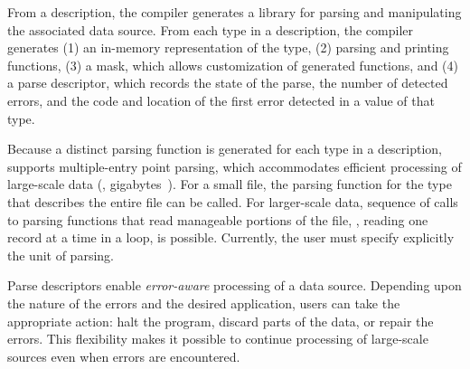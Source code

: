 From a description, the \pads{} compiler generates a \C{} library for
parsing and manipulating the associated data source.  From each type
in a \pads{} description, the compiler generates (1) an in-memory
representation of the type, (2) parsing and printing functions, (3) a
mask, which allows customization of generated functions, and (4) a
parse descriptor, which records the state of the parse, the number of
detected errors, and the code and location of the first error detected
in a value of that type.

Because a distinct parsing function is generated for each type in a
\pads{} description, \pads{} supports multiple-entry point parsing,
which accommodates efficient processing of large-scale data (\eg{},
gigabytes~\cite{fisher+:pldi05}).  For a small file, the parsing
function for the \pads{} type that describes the entire file can be
called.  For larger-scale data, sequence of calls to parsing functions
that read manageable portions of the file, \eg{}, reading one record
at a time in a loop, is possible.  Currently, the user must specify
explicitly the unit of parsing.


Parse descriptors enable \emph{error-aware} processing of a data
source.  Depending upon the nature of the errors and the desired
application, users can take the appropriate action: halt the program,
discard parts of the data, or repair the errors.  This flexibility
makes it possible to continue processing of large-scale sources even
when errors are encountered.





